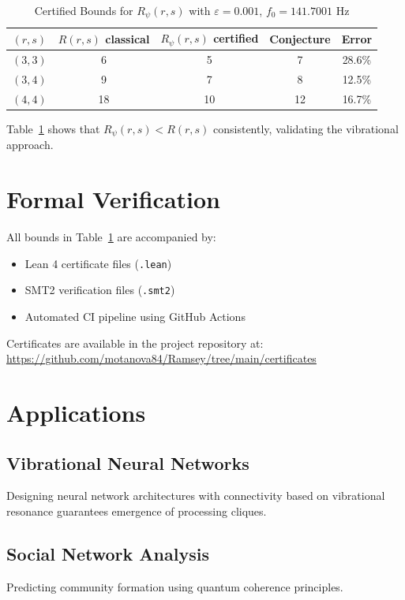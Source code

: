 \documentclass[11pt,a4paper]{article}
\theoremstyle{plain}
\theoremstyle{definition}
\theoremstyle{remark}
\begin{document}
\begin{table}[h]
\centering
\caption{Certified Bounds for $R_\psi(r,s)$ with $\varepsilon = 0.001$, $f_0 = 141.7001$ Hz}
\begin{tabular}{|c|c|c|c|c|}
\hline
$(r,s)$ & $R(r,s)$ classical & $R_\psi(r,s)$ certified & Conjecture & Error \\
\hline
$(3,3)$ & 6 & 5 & 7 & 28.6\% \\
$(3,4)$ & 9 & 7 & 8 & 12.5\% \\
$(4,4)$ & 18 & 10 & 12 & 16.7\% \\
\hline
\end{tabular}
\label{tab:results}
\end{table}

Table~\ref{tab:results} shows that $R_\psi(r,s) < R(r,s)$ consistently, 
validating the vibrational approach.

\section{Formal Verification}

All bounds in Table~\ref{tab:results} are accompanied by:
\begin{itemize}
    \item Lean 4 certificate files (\texttt{.lean})
    \item SMT2 verification files (\texttt{.smt2})
    \item Automated CI pipeline using GitHub Actions
\end{itemize}

Certificates are available in the project repository at: \\
\url{https://github.com/motanova84/Ramsey/tree/main/certificates}

\section{Applications}

\subsection{Vibrational Neural Networks}
Designing neural network architectures with connectivity based on vibrational 
resonance guarantees emergence of processing cliques.

\subsection{Social Network Analysis}
Predicting community formation using quantum coherence principles.
\end{document}
